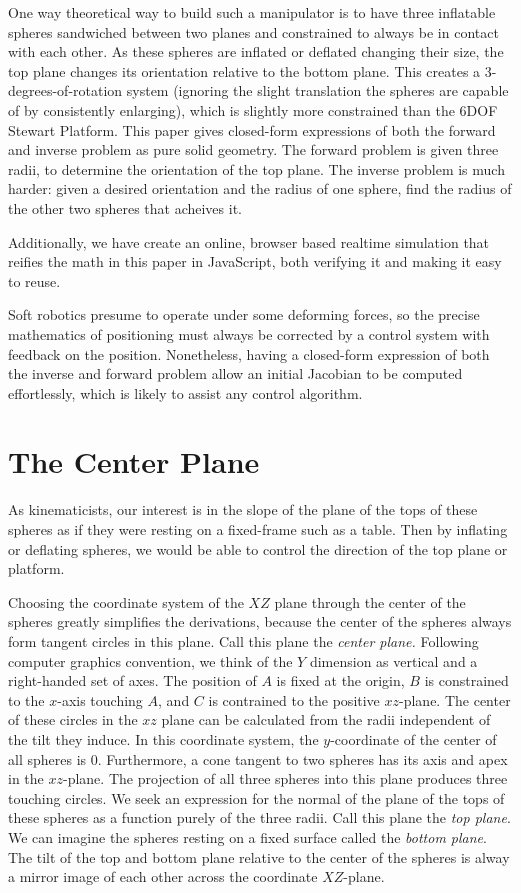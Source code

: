\documentclass{article}
\begin{document}
One way theoretical way to build such a manipulator is to have three inflatable spheres sandwiched between two planes
and constrained to always be in contact with each other.
As these spheres are inflated or deflated changing
their size, the top plane changes its orientation relative to the bottom plane.
This creates a 3-degrees-of-rotation system
(ignoring the slight translation the spheres are capable of by consistently enlarging),
which is slightly more constrained than the 6DOF Stewart Platform.
This paper gives closed-form expressions of both
the forward and inverse problem as pure solid geometry.
The forward problem is given three radii,
to determine the orientation of the top plane.
The inverse problem is much harder: given a desired orientation and the radius of one
sphere, find the radius of the other two spheres that acheives it.

Additionally, we have create an online, browser based realtime simulation that reifies
the math in this paper in JavaScript, both verifying it and making it easy to reuse.

Soft robotics presume to operate under some deforming forces, so the precise mathematics
of positioning must always be corrected by a control system with feedback on the position.
Nonetheless, having a closed-form expression of both the inverse and forward problem allow
an initial Jacobian to be computed effortlessly, which is likely to assist any control algorithm.

\section{The Center Plane}

As kinematicists,
our interest is in the slope of the plane of the tops of these spheres
as if they were resting on a fixed-frame such as a table. Then by inflating or deflating spheres,
we would be able to control the direction of the top plane or platform.

Choosing the coordinate system of the $XZ$ plane through the center of the spheres greatly
simplifies the derivations, because the center of the spheres always form tangent circles
in this plane. Call this plane the {\em center plane.}
Following computer graphics convention, we think of the $Y$ dimension as vertical and a
right-handed set of axes.
The position of $A$ is fixed at the origin, $B$ is constrained to the $x$-axis touching $A$, and
$C$ is contrained to the positive $xz$-plane. The center of these circles in the $xz$ plane can be
calculated from the radii independent of the tilt they induce.
In this coordinate system, the $y$-coordinate of the center of all spheres is $0$.
Furthermore, a cone tangent to two spheres has its axis and apex in the $xz$-plane.
The projection of all three spheres into this plane produces three touching circles.
We seek an expression for the normal of the plane of the tops of these spheres as a function
purely of the three radii. Call this plane the {\em top plane}.
We can imagine the spheres resting on a fixed surface called the {\em bottom plane}.
The tilt of the top and bottom plane relative to the center of the spheres
is alway a mirror image of each other across the coordinate $XZ$-plane.
\end{document}
